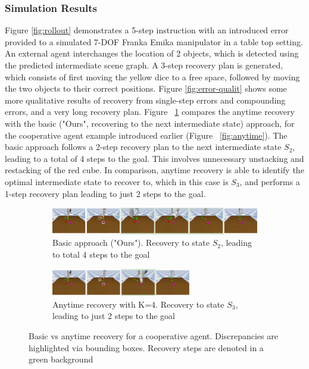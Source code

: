 \subsubsection{Simulation Results}
Figure \ref{fig:rollout} demonstrates a 5-step instruction with an introduced error provided to a simulated 7-DOF Franka Emika manipulator in a table top setting. An external agent interchanges the location of 2 objects, which is detected using the predicted intermediate scene graph. A 3-step recovery plan is generated, which consists of first moving the yellow dice to a free space, followed by moving the two objects to their correct positions. Figure \ref{fig:error-qualit} shows some more qualitative results of recovery from single-step errors and compounding errors, and a very long recovery plan.
Figure ~\ref{fig:anytime-qual} compares the anytime recovery with the basic ("Ours", recovering to the next intermediate state) approach, for the cooperative agent example introduced earlier (Figure ~\ref{fig:anytime}). The basic approach follows a 2-step recovery plan to the next intermediate state $S_2$, leading to a total of 4 steps to the goal. This involves unnecessary unstacking and restacking of the red cube. In comparison, anytime recovery is able to identify the optimal intermediate state to recover to, which in this case is $S_3$, and performs a 1-step recovery plan leading to just 2 steps to the goal.

\begin{figure}
    \begin{subfigure}{\textwidth}
        \includegraphics[width=\textwidth]{assets/anytime-o.png}
        \caption{Basic approach ("Ours"). Recovery to state $S_2$, leading to total 4 steps to the goal}
    \end{subfigure}

    \vspace{0.5cm}

    \begin{subfigure}{\textwidth}
        \includegraphics[width=0.67\textwidth]{assets/anytime-a.png}
        \caption{Anytime recovery with K=4. Recovery to state $S_3$, leading to just 2 steps to the goal}
    \end{subfigure}
    
    \caption{Basic vs anytime recovery for a cooperative agent. Discrepancies are highlighted via bounding boxes. Recovery steps are denoted in a green background}
    \label{fig:anytime-qual}
\end{figure}

